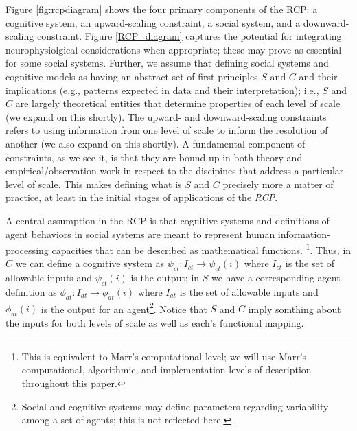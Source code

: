 \documentclass{article}
\begin{document}
Figure \ref{fig:rcpdiagram} shows the four primary components of the RCP: a cognitive system, an upward-scaling constraint, a social system, and a downward-scaling constraint.  Figure \ref{RCP_diagram} captures the potential for integrating neurophysiolgical considerations when appropriate; these may prove as essential for some social systems. Further, we assume that defining social systems and cognitive models as having an abstract set of first principles $S$ and $C$ and their implications (e.g., patterns expected in data and their interpretation); i.e., $S$ and $C$ are largely theoretical entities that determine properties of each level of scale (we expand on this shortly).  The upward- and downward-scaling constraints refers to using information from one level of scale to inform the resolution of another (we also expand on this shortly).  A fundamental component of constraints, as we see it, is that they are bound up in both theory and empirical/observation work in respect to the discipines that address a particular level of scale.  This makes defining what is $S$ and $C$ precisely more a matter of practice, at least in the initial stages of applications of the \textit{RCP}.



A central assumption in the RCP is that cognitive systems and definitions of agent behaviors in social systems are meant to represent human information-processing capacities that can be described as mathematical functions. \cite{van Rooij, 2008}\footnote{This is equivalent to Marr's computational level; we will use Marr's computational, algorithmic, and implementation levels of description\cite{Marr,1981} throughout this paper.}. Thus, in $C$ we can define a cognitive system as $\psi_{ct}: I_{ct} \rightarrow \psi_{ct}(i)$ where $I_{ct}$ is the set of allowable inputs and $\psi_{ct}(i)$ is the output; in $S$ we have a corresponding agent definition as $\phi_{at}: I_{at} \rightarrow \phi_{at}(i)$ where $I_{at}$ is the set of allowable inputs and $\phi_{at}(i)$ is the output for an agent\footnote{Social and cognitive systems may define parameters regarding variability among a set of agents; this is not reflected here.}.  Notice that $S$ and $C$ imply somthing about the inputs for both levels of scale as well as each's functional mapping.
\end{document}
